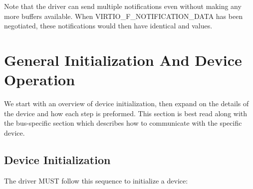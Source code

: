 Note that the driver can send multiple notifications even without
making any more buffers available. When VIRTIO_F_NOTIFICATION_DATA
has been negotiated, these notifications would then have
identical  and  values.



\chapter{General Initialization And Device Operation}\label{sec:General Initialization And Device Operation}

We start with an overview of device initialization, then expand on the
details of the device and how each step is preformed.  This section
is best read along with the bus-specific section which describes
how to communicate with the specific device.

\section{Device Initialization}\label{sec:General Initialization And Device Operation / Device Initialization}

The driver MUST follow this sequence to initialize a device:

